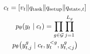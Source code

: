 \documentclass[border=7pt,varwidth=108mm]{standalone}
\begin{document}
\color{ink}\fontsize{15}{23}\selectfont
\[
\begin{gathered} c_t=[v_t\Vert q_{\rm task}\Vert q_{\rm setup}\Vert q_{{\rm state},t}]\\ p_\theta(y_t\mid c_t)=\prod_{g\in\mathcal G}\prod_{j=1}^{L_g}\\ p_\theta\!\left(y^g_{t,j}\mid c_t,y_t^{<g},y^g_{t,<j}\right)\end{gathered}
\]
\end{document}
